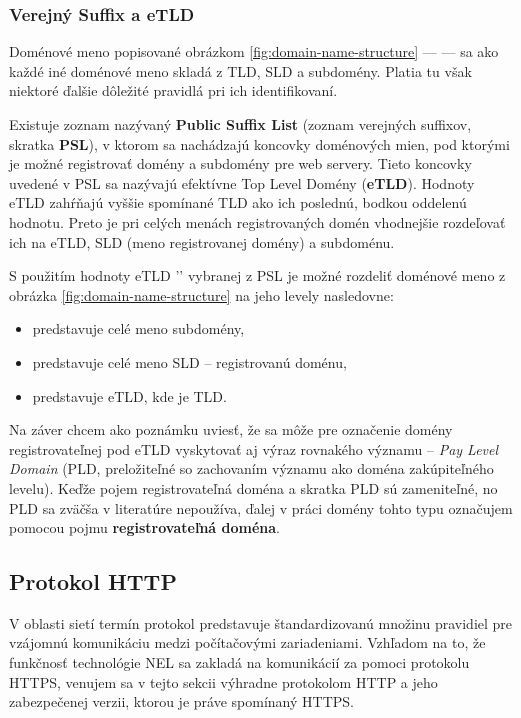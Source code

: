 \subsubsection{Verejný Suffix a eTLD}
\label{public-suffix-and-etld}

Doménové meno popisované obrázkom \ref{fig:domain-name-structure} ---  --- sa ako každé iné doménové meno skladá z TLD, SLD a subdomény. 
Platia tu však niektoré ďalšie dôležité pravidlá pri ich identifikovaní.

Existuje zoznam nazývaný \textbf{Public Suffix List} (zoznam verejných suffixov, skratka \textbf{PSL}), 
v ktorom sa nachádzajú koncovky doménových mien, pod ktorými je možné registrovať domény a subdomény pre web servery.
Tieto koncovky uvedené v PSL sa nazývajú efektívne Top Level Domény (\textbf{eTLD}).
Hodnoty eTLD zahŕňajú vyššie spomínané TLD ako ich poslednú, bodkou oddelenú hodnotu.
Preto je pri celých menách registrovaných domén vhodnejšie rozdeľovať ich na eTLD, SLD (meno registrovanej domény) a subdoménu.

S použitím hodnoty eTLD '' vybranej z PSL je možné rozdeliť doménové meno z obrázka \ref{fig:domain-name-structure} na jeho levely nasledovne: 
\begin{itemize}
    \item {} predstavuje celé meno subdomény,
    \item {} predstavuje celé meno SLD -- registrovanú doménu,
    \item {} predstavuje eTLD, kde  je TLD.
\end{itemize}


Na záver chcem ako poznámku uviesť, že sa môže pre označenie domény registrovateľnej pod eTLD vyskytovať aj výraz rovnakého významu 
-- \textit{Pay Level Domain} (PLD, preložiteľné so zachovaním významu ako doména zakúpiteľného levelu).
Keďže pojem registrovateľná doména a skratka PLD sú zameniteľné, no PLD sa zväčša v literatúre nepoužíva, 
ďalej v práci domény tohto typu označujem pomocou pojmu \textbf{registrovateľná doména}.

\subsection{Protokol HTTP}
\label{protokol-http}
V oblasti sietí termín protokol predstavuje štandardizovanú množinu pravidiel pre vzájomnú komunikáciu medzi počítačovými zariadeniami. %
Vzhľadom na to, že funkčnosť technológie NEL sa zakladá na komunikácií za pomoci protokolu HTTPS, %
venujem sa v tejto sekcii výhradne protokolom HTTP a jeho zabezpečenej verzii, ktorou je práve spomínaný HTTPS. 

